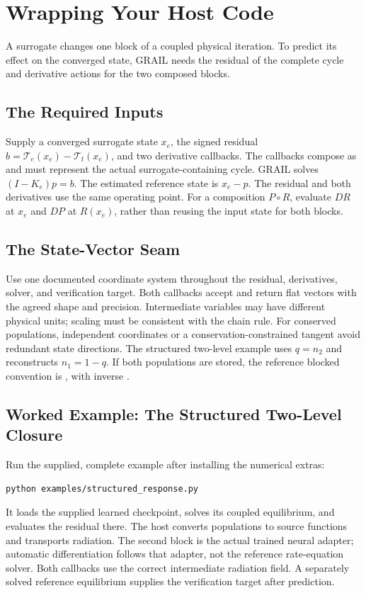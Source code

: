 \chapter{Wrapping Your Host Code}
\label{ch:wrapping}
A surrogate changes one block of a coupled physical iteration. To predict
its effect on the converged state, GRAIL needs the residual of the complete
cycle and derivative actions for the two composed blocks.

\section{The Required Inputs}
\label{sec:five-things}
Supply a converged surrogate state $x_e$, the signed residual
$b=\mathcal T_e(x_e)-\mathcal T_t(x_e)$, and two derivative callbacks.
The callbacks compose as  and must
represent the actual surrogate-containing cycle. GRAIL solves
$(I-K_e)p=b$. The estimated reference state is $x_e-p$.
The residual and both derivatives use the same operating point.
For a composition $P\circ R$, evaluate $DR$ at $x_e$ and $DP$ at
$R(x_e)$, rather than reusing the input state for both blocks.

\section{The State-Vector Seam}
\label{sec:seam}
Use one documented coordinate system throughout the residual, derivatives,
solver, and verification target. Both callbacks accept and return flat
vectors with the agreed shape and precision. Intermediate variables may
have different physical units; scaling must be consistent with the chain rule.
For conserved populations, independent coordinates or a conservation-constrained
tangent avoid redundant state directions. The structured two-level example
uses $q=n_2$ and reconstructs $n_1=1-q$.
If both populations are stored, the reference blocked convention is
, with inverse
.

\section{Worked Example: The Structured Two-Level Closure}
\label{sec:twolevel-worked}
Run the supplied, complete example after installing the numerical extras:
\begin{lstlisting}[style=grailInStyle]
python examples/structured_response.py
\end{lstlisting}
It loads the supplied learned checkpoint, solves its coupled equilibrium,
and evaluates the residual there. The host converts populations to source
functions and transports radiation. The second block is the actual trained
neural adapter; automatic differentiation follows that adapter, not the
reference rate-equation solver. Both callbacks use the correct intermediate
radiation field. A separately solved reference equilibrium supplies the
verification target after prediction.

